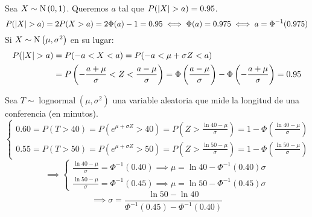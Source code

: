  Sea $X\sim\operatorname{N}\left(0,1\right)$. Queremos $a$ tal que $P(\left|X\right| > a) = 0.95$.
\[P(\left|X\right| > a) = 2P(X > a) = 2\Phi(a) -1 = 0.95 \iff \Phi(a) = 0.975 \iff a = \Phi^{-1}(0.975)\]
Si $X\sim\operatorname{N}\left(\mu, \sigma^2\right)$ en su lugar:
\[\begin{aligned}
		P(\left|X\right| > a) & = P(-a<X<a) = P(-a < \mu + \sigma Z < a)                                                                                                                 \\
		               & = P\left(-\frac{a+\mu}{\sigma} < Z < \frac{a-\mu}{\sigma}\right) = \Phi\left(\frac{a-\mu}{\sigma}\right) - \Phi\left(-\frac{a+\mu}{\sigma}\right) = 0.95
	\end{aligned}\]

 Sea $T\sim\operatorname{lognormal}(\mu, \sigma^2)$ una variable aleatoria que mide la longitud de una conferencia (en minutos).
\[\begin{cases}
		0.60 = P(T > 40) = P(e^{\mu + \sigma Z} > 40) = P\left(Z > \frac{\ln{40}-\mu}{\sigma}\right) = 1 - \Phi\left(\frac{\ln{40}-\mu}{\sigma}\right) \\
		0.55 = P(T > 50) = P(e^{\mu + \sigma Z} > 50) = P\left(Z > \frac{\ln{50}-\mu}{\sigma}\right) = 1 - \Phi\left(\frac{\ln{50}-\mu}{\sigma}\right)
	\end{cases}\]
\[\implies \begin{cases}
		\frac{\ln{40}-\mu}{\sigma} = \Phi^{-1}(0.40) \implies \mu = \ln{40} - \Phi^{-1}(0.40)\sigma \\
		\frac{\ln{50}-\mu}{\sigma} = \Phi^{-1}(0.45) \implies \mu = \ln{50} - \Phi^{-1}(0.45)\sigma
	\end{cases}\]
\[\implies \sigma = \frac{\ln{50}-\ln{40}}{\Phi^{-1}(0.45)-\Phi^{-1}(0.40)}\]